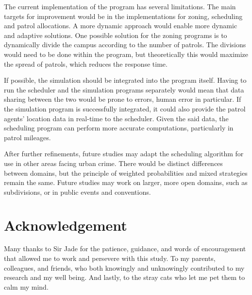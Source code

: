 \documentclass[journal]{./IEEE/IEEEtran}
\begin{document}
The current implementation of the program has several limitations. The main targets for improvement would be in the implementations for zoning, scheduling and patrol allocations. A more dynamic approach would enable more dynamic and adaptive solutions. One possible solution for the zoning programs is to dynamically divide the campus according to the number of patrols. The divisions would need to be done within the program, but theoretically this would maximize the spread of patrols, which reduces the response time.

If possible, the simulation should be integrated into the program itself. Having to run the scheduler and the simulation programs separately would mean that data sharing between the two would be prone to errors, human error in particular. If the simulation program is successfully integrated, it could also provide the patrol agents' location data in real-time to the scheduler. Given the said data, the scheduling program can perform more accurate computations, particularly in patrol mileages.

After further refinements, future studies may adapt the scheduling algorithm for use in other areas facing urban crime. There would be distinct differences between domains, but the principle of weighted probabilities and mixed strategies remain the same. Future studies may work on larger, more open domains, such as subdivisions, or in public events and conventions.

\section*{Acknowledgement}
Many thanks to Sir Jade for the patience, guidance, and words of encouragement that allowed me to work and persevere with this study. To my parents, colleagues, and friends, who both knowingly and unknowingly contributed to my research and my well being. And lastly, to the stray cats who let me pet them to calm my mind.









\end{document}
